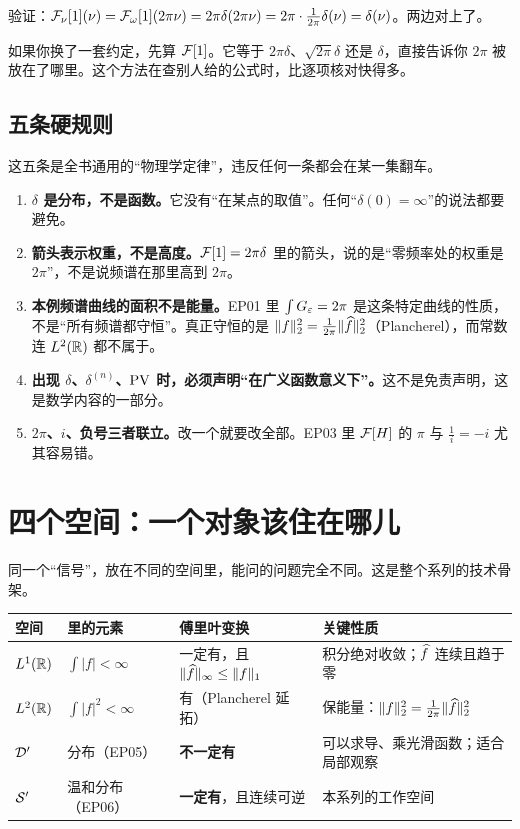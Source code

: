 验证：$\mathcal{F}_\nu[1](\nu)=\mathcal{F}_\omega[1](2\pi\nu)=2\pi\delta(2\pi\nu)=2\pi\cdot\frac{1}{2\pi}\delta(\nu)=\delta(\nu)$。两边对上了。

\begin{warnbox}[一句话自检法]
如果你换了一套约定，先算 $\mathcal{F}[1]$。它等于 $2\pi\delta$、$\sqrt{2\pi}\delta$ 还是 $\delta$，直接告诉你 $2\pi$ 被放在了哪里。这个方法在查别人给的公式时，比逐项核对快得多。
\end{warnbox}

\subsection*{五条硬规则}

这五条是全书通用的“物理学定律”，违反任何一条都会在某一集翻车。

\begin{enumerate}[leftmargin=2em,itemsep=0.45em]
\item \textbf{$\delta$ 是分布，不是函数。}它没有“在某点的取值”。任何“$\delta(0)=\infty$”的说法都要避免。
\item \textbf{箭头表示权重，不是高度。}$\mathcal{F}[1]=2\pi\delta$ 里的箭头，说的是“零频率处的权重是 $2\pi$”，不是说频谱在那里高到 $2\pi$。
\item \textbf{本例频谱曲线的面积不是能量。}EP01 里 $\int G_{\varepsilon}=2\pi$ 是这条特定曲线的性质，不是“所有频谱都守恒”。真正守恒的是 $\|f\|_2^2=\frac{1}{2\pi}\|\widehat{f}\|_2^2$（Plancherel），而常数连 $L^2(\mathbb{R})$ 都不属于。
\item \textbf{出现 $\delta$、$\delta^{(n)}$、$\operatorname{PV}$ 时，必须声明“在广义函数意义下”。}这不是免责声明，这是数学内容的一部分。
\item \textbf{$2\pi$、$i$、负号三者联立。}改一个就要改全部。EP03 里 $\mathcal{F}[H]$ 的 $\pi$ 与 $\frac{1}{i}=-i$ 尤其容易错。
\end{enumerate}

\section{四个空间：一个对象该住在哪儿}

同一个“信号”，放在不同的空间里，能问的问题完全不同。这是整个系列的技术骨架。

\begin{center}
\small
\renewcommand{\arraystretch}{1.5}
\begin{tabularx}{\textwidth}{@{}L{1.7cm}L{4.4cm}L{4.2cm}Y@{}}
\toprule
空间 & 里的元素 & 傅里叶变换 & 关键性质 \\
\midrule
$L^1(\mathbb{R})$ & $\int|f|<\infty$ & 一定有，且 $\|\widehat{f}\|_\infty\le\|f\|_1$ & 积分绝对收敛；$\widehat{f}$ 连续且趋于零 \\
$L^2(\mathbb{R})$ & $\int|f|^{2}<\infty$ & 有（Plancherel 延拓） & 保能量：$\|f\|_2^{2}=\frac{1}{2\pi}\|\widehat{f}\|_2^{2}$ \\
$\mathcal{D}'$ & 分布（EP05） & \textbf{不一定有} & 可以求导、乘光滑函数；适合局部观察 \\
$\mathcal{S}'$ & 温和分布（EP06） & \textbf{一定有}，且连续可逆 & 本系列的工作空间 \\
\bottomrule
\end{tabularx}
\end{center}


